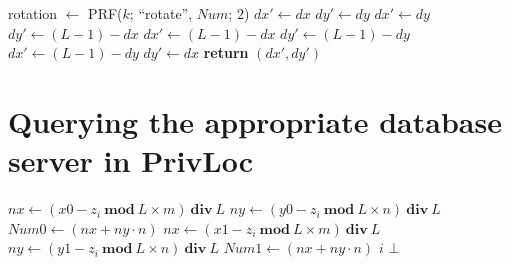 \documentclass{llncs}
\newcommand\sol{{\sf PrivLoc}}
\newcommand\MK{\mathit{k}}
\newcommand\LENGTH{\mathit{L}}
\newcommand\COLUMNS{\mathit{m}}
\newcommand\ROWS{\mathit{n}}
\begin{document}
\begin{algorithmic}[1]
\Procedure{rotateTile}{$x,y,\MK$}
\State rotation $\gets$ PRF($\MK$; ``rotate'', $\mathit{Num}$; $2$)
	\State $dx' \gets dx$
	\State $dy' \gets dy$
	\State $dx' \gets dy$
	\State $dy' \gets (\LENGTH-1)-dx$
  \State $dx' \gets (\LENGTH-1)-dx$
	\State $dy' \gets (\LENGTH-1)-dy$
  \State $dx' \gets (\LENGTH-1)-dy$
	\State $dy' \gets dx$
\EndIf
\State \textbf{return} $(dx', dy')$
\EndProcedure
\end{algorithmic}

\vspace{-1.5 em}
\section{Querying the appropriate database server in \sol}\label{alg:chooseserver}
\vspace{-0.5 em}
	
\begin{algorithmic}[1]
 
\State $nx \gets (x0 - z_i~\mathbf{mod}~\LENGTH \times \COLUMNS)~\mathbf{div}~\LENGTH$
\State $ny \gets (y0 - z_i~\mathbf{mod}~\LENGTH \times \ROWS)~\mathbf{div}~\LENGTH$
\State $\mathit{Num0}\gets (nx + ny \cdot \ROWS)$
\State $nx \gets (x1 - z_i~\mathbf{mod}~\LENGTH \times \COLUMNS)~\mathbf{div}~\LENGTH$
\State $ny \gets (y1 - z_i~\mathbf{mod}~\LENGTH \times \ROWS)~\mathbf{div}~\LENGTH$
\State $\mathit{Num1}\gets (nx + ny \cdot \ROWS)$
 \State \Return $i$ \EndIf
\EndFor
\State \Return $\bot$
\EndProcedure
\end{algorithmic}
\end{document}
